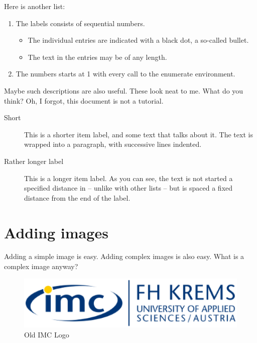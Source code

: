 \documentclass{imc-inf}
\begin{document}
Here is another list: 

\begin{enumerate}
	\item The labels consists of sequential numbers.
	\begin{itemize}
		\item The individual entries are indicated with a black dot, a so-called bullet.
		\item The text in the entries may be of any length.
	\end{itemize}
	\item The numbers starts at 1 with every call to the enumerate environment.
\end{enumerate}

Maybe such descriptions are also useful. These look neat to me. What do you think? Oh, I forgot, this document is not a tutorial. 
\begin{description}
	\item[Short] This is a shorter item label, and some text that talks
	about it. The text is wrapped into a paragraph, with successive
	lines indented.
	\item[Rather longer label] This is a longer item label.  As you can
	see, the text is not started a specified distance in -- unlike
	with other lists -- but is spaced a fixed distance from the end
	of the label.
\end{description}



\section{Adding images}
Adding a simple image is easy. Adding complex images is also easy. What is a complex image anyway? 
\begin{figure}[h]
	\centering
	\includegraphics[width=1.0\textwidth]{imclogo.png}
	\caption{Old IMC Logo}
	\label{fig:logo}
\end{figure}
\end{document}

